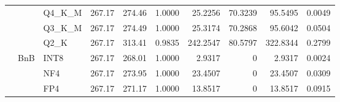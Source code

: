 \begin{longtable}{ll l rrrrrrr}
 &  & Q4\_K\_M & 267.17 & 274.46 & 1.0000 & 25.2256 & 70.3239 & 95.5495 & 0.0049 \\
 &  & Q3\_K\_M & 267.17 & 274.49 & 1.0000 & 25.3174 & 70.2868 & 95.6042 & 0.0504 \\
 &  & Q2\_K & 267.17 & 313.41 & 0.9835 & 242.2547 & 80.5797 & 322.8344 & 0.2799 \\
 & BnB & INT8 & 267.17 & 268.01 & 1.0000 & 2.9317 & \cellcolor{cyan!12} $0$ & 2.9317 & 0.0024 \\
 &  & NF4 & 267.17 & 273.95 & 1.0000 & 23.4507 & \cellcolor{cyan!12} $0$ & 23.4507 & 0.0309 \\
 &  & FP4 & 267.17 & 271.17 & 1.0000 & 13.8517 & \cellcolor{cyan!12} $0$ & 13.8517 & 0.0915 \\
\end{longtable}
\endgroup